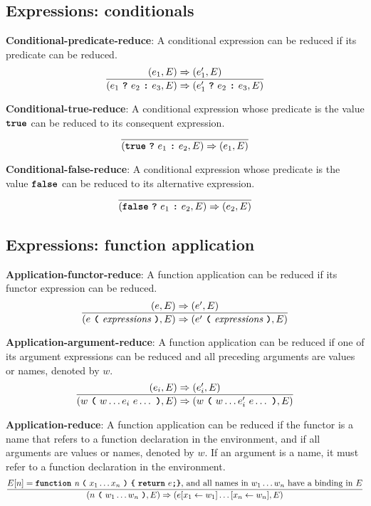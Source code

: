 \subsection*{Expressions: conditionals}

\textbf{Conditional-predicate-reduce}: A conditional
expression
can be reduced if its predicate can be reduced.
\[
\frac{
  ( e_1 , E ) \Rightarrow (e_1', E)
}{
  (e_1\  \textbf{\texttt{?}}\ e_2\ \textbf{\texttt{:}}\ e_3, E)
  \Rightarrow
  (e_1'\ \textbf{\texttt{?}}\ e_2\ \textbf{\texttt{:}}\ e_3, E)
}
\]

\vspace{10mm}
\textbf{Conditional-true-reduce}: A conditional
expression whose predicate is the value
$\textbf{\texttt{true}}$
can be reduced to its consequent expression.
\[
\frac{
}{
  (\textbf{\texttt{true}}\  \textbf{\texttt{?}}\ e_1\ \textbf{\texttt{:}}\ e_2, E)
  \Rightarrow
  (e_1, E)
}
\]

\vspace{10mm}
\textbf{Conditional-false-reduce}: A conditional
expression whose predicate is the value
$\textbf{\texttt{false}}$
can be reduced to its alternative expression.
\[
\frac{
}{
  (\textbf{\texttt{false}}\  \textbf{\texttt{?}}\ e_1\ \textbf{\texttt{:}}\ e_2, E)
  \Rightarrow
  (e_2, E)
}
\]


\subsection*{Expressions: function application}

\textbf{Application-functor-reduce}: A function application
can be reduced if its functor expression can be reduced.
\[
\frac{
  ( e , E ) \Rightarrow (e', E)
}{
  (e\  \textbf{\texttt{(}}\ \textit{expressions} \ \textbf{\texttt{)}}, E)
  \Rightarrow
  (e'\  \textbf{\texttt{(}}\ \textit{expressions} \ \textbf{\texttt{)}}, E)
}
\]

\vspace{10mm}
\textbf{Application-argument-reduce}: A function application
can be reduced if one of its argument expressions can be reduced and all
preceding arguments are values or names, denoted by $w$.
\[
\frac{
  ( e_i , E ) \Rightarrow (e_i', E)
}{
  (w\  \textbf{\texttt{(}}\ w \ldots e_i \ e \ldots\ \textbf{\texttt{)}}, E)
  \Rightarrow
  (w\  \textbf{\texttt{(}}\ w \ldots e_i' \ e \ldots\ \textbf{\texttt{)}}, E)
}
\]

\vspace{10mm}
\textbf{Application-reduce}: A function application
can be reduced if the functor is a name that refers to
a function declaration in the environment, and if all
arguments are values or names, denoted by $w$. If an argument
is a name, it must refer to a function declaration in the
environment.
\[
\frac{
  E[n] = \textbf{\texttt{function}}\  \textit{n}
                 \ \textbf{\texttt{(}}\  x_1 \ldots x_n
                 \ \textbf{\texttt{)}}\ \textbf{\texttt{\{}}\ \textbf{\texttt{return}}\ e \textbf{\texttt{;}} \textbf{\texttt{\}}}
\mbox{, and all names in $w_1 \ldots w_n$ have a binding in $E$}
}{
  (n\  \textbf{\texttt{(}}\ w_1 \ldots w_n\ \textbf{\texttt{)}}, E)
  \Rightarrow
  (e[x_1 \leftarrow w_1]\ldots[x_n \leftarrow w_n], E)
}
\]

